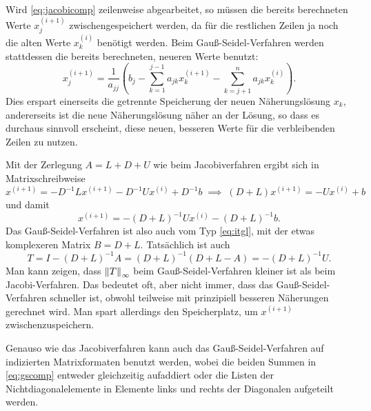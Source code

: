 \subsection{}

Wird \eqref{eq:jacobicomp} zeilenweise abgearbeitet, so müssen die
bereits berechneten Werte $x_j^{(i+1)}$ zwischengespeichert werden,
da für die restlichen Zeilen ja noch die alten Werte $x_k^{(i)}$
benötigt werden. Beim Gauß-Seidel-Verfahren werden stattdessen die
bereits berechneten, neueren Werte benutzt:
\begin{equation}
  \label{eq:gscomp}
  x_j^{(i+1)} = \frac{1}{a_{jj}}\left(b_j -
    \sum_{k=1}^{j-1} a_{jk}x_k^{(i+1)} - \sum_{k=j+1}^n a_{jk}x_k^{(i)}\right).
\end{equation}
Dies erspart einerseits die getrennte Speicherung der neuen
Näherungslösung $x_k$, andererseits ist die neue Näherungslösung näher
an der Lösung, so dass es durchaus sinnvoll erscheint, diese neuen, besseren
Werte für die verbleibenden Zeilen zu nutzen.

Mit der Zerlegung $A=L + D + U$ wie beim Jacobiverfahren ergibt sich
in Matrixschreibweise
\begin{equation}
  x^{(i+1)} = -D^{-1}L x^{(i+1)} - D^{-1} U x^{(i)} + D^{-1}b
  \;\implies\;
  (D + L)x^{(i+1)} = - U x^{(i)} + b
\end{equation}
und damit
\begin{equation}
  x^{(i+1)} = -(D+L)^{-1} U x^{(i)} - (D+L)^{-1}b.
\end{equation}
Das Gauß-Seidel-Verfahren ist also auch vom Typ \eqref{eq:itgl}, mit
der etwas komplexeren Matrix $B= D + L$. Tatsächlich ist auch
\begin{equation}
  \label{eq:gst}
  T = I - (D + L)^{-1} A = (D + L)^{-1}(D + L - A) = -(D+L)^{-1} U.
\end{equation}
Man kann zeigen, dass $\left\lVert{T}\right\rVert_\infty$ beim Gauß-Seidel-Verfahren
kleiner ist als beim Jacobi-Verfahren. Das bedeutet oft, aber nicht immer,
dass das Gauß-Seidel-Verfahren schneller ist, obwohl teilweise mit
prinzipiell besseren Näherungen gerechnet
wird. Man spart allerdings den Speicherplatz, um $x^{(i+1)}$
zwischenzuspeichern.

Genauso wie das Jacobiverfahren kann auch das Gauß-Seidel-Verfahren
auf indizierten Matrixformaten benutzt werden, wobei die beiden Summen
in \eqref{eq:gscomp} entweder gleichzeitig aufaddiert oder die
Listen der Nichtdiagonalelemente in Elemente links und rechts der
Diagonalen aufgeteilt werden.

